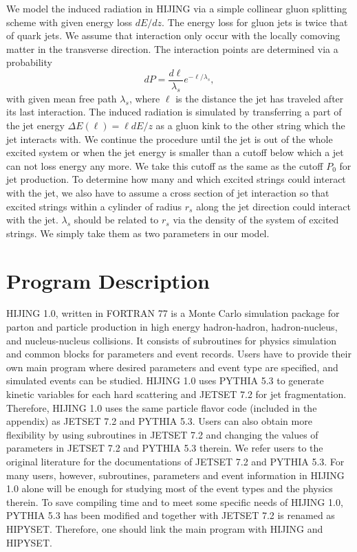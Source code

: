         We model the induced radiation in HIJING via a simple
collinear gluon splitting scheme with given energy loss $dE/dz$.
The energy loss for gluon jets is twice that of quark jets\cite{dedx}.
We assume that interaction only occur with the locally comoving
matter in the transverse direction. The interaction points are
determined via a probability
\begin{equation}
        dP=\frac{d\ell}{\lambda_s}e^{-\ell/\lambda_s},
\end{equation}
with given mean free path $\lambda_s$, where $\ell$ is the 
distance the jet has traveled after its last interaction. 
The induced radiation is simulated by transferring a part of
the jet energy $\Delta E(\ell)=\ell dE/z$ as a gluon kink to
the other string which the jet interacts with. We continue 
the procedure until the jet is out of the whole excited system 
or when the jet energy is smaller than a cutoff below which 
a jet can not loss energy any more. We take this cutoff as 
the same as the cutoff $P_0$ for jet production. To determine 
how many and which excited strings could interact with the 
jet, we also have to assume a cross section of jet interaction so that
excited strings within a cylinder of radius $r_s$ along the jet 
direction could interact with the jet. $\lambda_s$
should be related to $r_s$ via the density of the system of excited 
strings. We simply take them as two parameters in our model.

          
\section{Program Description}


        HIJING 1.0, written in  FORTRAN 77 is a Monte Carlo 
simulation package for parton and particle production 
in high energy hadron-hadron, hadron-nucleus,
and nucleus-nucleus collisions. It consists of subroutines for 
physics simulation and common blocks for parameters and event
records. Users have to provide their own main program where desired
parameters and event type are specified, and simulated events
can be studied. HIJING 1.0 uses PYTHIA 5.3 to generate kinetic
variables for each hard scattering and JETSET 7.2 for jet
fragmentation. Therefore, HIJING 1.0 uses the same particle 
flavor code (included in the appendix) 
as JETSET 7.2 and PYTHIA 5.3. Users can also 
obtain more flexibility by using subroutines in JETSET 7.2 and 
changing the values of parameters in JETSET 7.2 and PYTHIA 5.3 
therein. We refer users to the original literature\cite{pythia,jetset} 
for the documentations of JETSET 7.2 and PYTHIA 5.3.
For many users, however, subroutines, parameters and event
information in HIJING 1.0 alone will be enough for studying
most of the event types and the physics therein. To save compiling 
time and to meet some specific needs of HIJING 1.0, PYTHIA 5.3 has 
been modified and together with JETSET 7.2 is renamed as HIPYSET. 
Therefore, one should link the main program with HIJING and HIPYSET.

